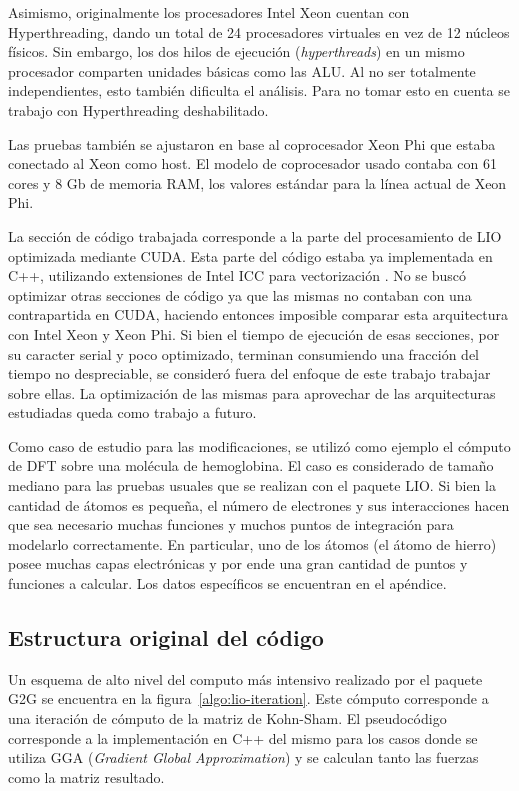 Asimismo, originalmente los procesadores Intel Xeon cuentan con Hyperthreading,
dando un total de 24 procesadores virtuales en vez de 12 n\'ucleos f\'isicos.
Sin embargo, los dos hilos de ejecuci\'on (\textit{hyperthreads}) en un mismo
procesador comparten unidades b\'asicas como las ALU. Al no ser totalmente
independientes, esto tambi\'en dificulta el an\'alisis. Para no tomar esto en
cuenta se trabajo con Hyperthreading deshabilitado.

Las pruebas tambi\'en se ajustaron en base al coprocesador Xeon Phi que estaba
conectado al Xeon como host. El modelo de coprocesador usado contaba con 61 
cores y 8 Gb de memoria RAM, los valores est\'andar para la l\'inea actual de
Xeon Phi.

La secci\'on de c\'odigo trabajada corresponde a la parte del procesamiento
de LIO optimizada mediante CUDA. Esta parte del c\'odigo estaba ya implementada
en C++, utilizando extensiones de Intel ICC para vectorizaci\'on . No se busc\'o
optimizar otras secciones de c\'odigo ya que las mismas no contaban con una
contrapartida en CUDA, haciendo entonces imposible comparar esta arquitectura con
Intel Xeon y Xeon Phi. Si bien el tiempo de ejecuci\'on de esas secciones, por su
caracter serial y poco optimizado, terminan consumiendo una fracci\'on del tiempo
no despreciable, se consider\'o fuera del enfoque de este trabajo trabajar sobre
ellas. La optimizaci\'on de las mismas para aprovechar de las arquitecturas
estudiadas queda como trabajo a futuro.

Como caso de estudio para las modificaciones, se utiliz\'o como ejemplo el c\'omputo
de DFT sobre una mol\'ecula de hemoglobina. El caso es considerado de tama\~no
mediano para las pruebas usuales que se realizan con el paquete LIO. Si bien la 
cantidad de \'atomos es peque\~na, el n\'umero de electrones y sus interacciones
hacen que sea necesario muchas funciones y muchos puntos de integraci\'on para
modelarlo correctamente. En particular, uno de los \'atomos (el \'atomo de hierro)
posee muchas capas electr\'onicas y por ende una gran cantidad de puntos y 
funciones a calcular. Los datos espec\'ificos se encuentran en el ap\'endice.


\subsection{Estructura original del c\'odigo}

Un esquema de alto nivel del computo m\'as intensivo realizado por el paquete
G2G se encuentra en la figura~\ref{algo:lio-iteration}. Este c\'omputo corresponde
a una iteraci\'on de c\'omputo de la matriz de Kohn-Sham. El pseudoc\'odigo
corresponde a la implementaci\'on en C++ del mismo para los casos donde se
utiliza GGA (\textit{Gradient Global Approximation}) y se calculan tanto las
fuerzas como la matriz resultado.

